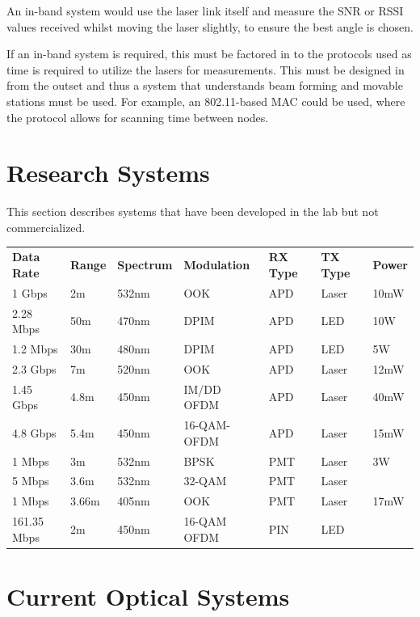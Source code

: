\documentclass{article}
\begin{document}
An in-band system would use the laser link itself and measure the \ac{SNR} or
\ac{RSSI} values received whilst moving the laser slightly, to ensure the best
angle is chosen.

If an in-band system is required, this must be factored in to the protocols
used as time is required to utilize the lasers for measurements. This must
be designed in from the outset and thus a system that understands beam forming
and movable stations must be used. For example, an 802.11-based \ac{MAC} could
be used, where the protocol allows for scanning time between nodes.

\section{Research Systems}
This section describes systems that have been developed in the lab but not
commercialized.

\begin{table}[H]
\begin{tabular}{lllllll}
\textbf{Data Rate} & \textbf{Range} & \textbf{Spectrum} & \textbf{Modulation} &
\textbf{RX Type} & \textbf{TX Type} & \textbf{Power} \\
1 Gbps      & 2m     & 532nm & OOK         & APD & Laser & 10mW           \\
2.28 Mbps   & 50m    & 470nm & DPIM        & APD & LED   & 10W            \\
1.2 Mbps    & 30m    & 480nm & DPIM        & APD & LED   & 5W             \\
2.3 Gbps    & 7m     & 520nm & OOK         & APD & Laser & 12mW           \\
1.45 Gbps   & 4.8m   & 450nm & IM/DD OFDM  & APD & Laser & 40mW           \\
4.8 Gbps    & 5.4m   & 450nm & 16-QAM-OFDM & APD & Laser & 15mW           \\
1 Mbps      & 3m     & 532nm & BPSK        & PMT & Laser & 3W             \\
5 Mbps      & 3.6m   & 532nm & 32-QAM      & PMT & Laser &                \\
1 Mbps      & 3.66m  & 405nm & OOK         & PMT & Laser & 17mW           \\
161.35 Mbps & 2m     & 450nm & 16-QAM OFDM & PIN & LED   &
\end{tabular}
\end{table}

\section{Current Optical Systems}
\end{document}
